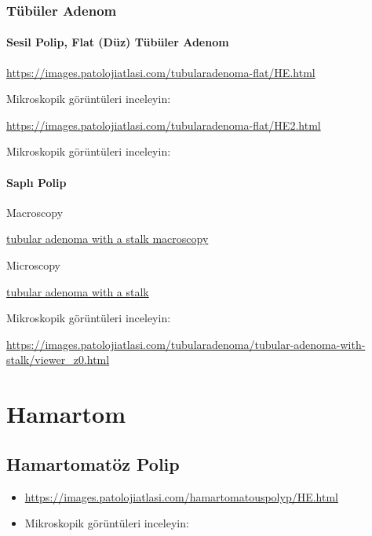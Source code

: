 \documentclass[
  letterpaper,
  DIV=11,
  numbers=noendperiod]{scrreprt}
\begin{document}
\hypertarget{tuxfcbuxfcler-adenom}{%
\subsection{Tübüler Adenom}\label{tuxfcbuxfcler-adenom}}

\hypertarget{sesil-polip-flat-duxfcz-tuxfcbuxfcler-adenom}{%
\subsubsection{Sesil Polip, Flat (Düz) Tübüler
Adenom}\label{sesil-polip-flat-duxfcz-tuxfcbuxfcler-adenom}}

\url{https://images.patolojiatlasi.com/tubularadenoma-flat/HE.html}

Mikroskopik görüntüleri inceleyin:

\url{https://images.patolojiatlasi.com/tubularadenoma-flat/HE2.html}

Mikroskopik görüntüleri inceleyin:

\hypertarget{saplux131-polip}{%
\subsubsection{Saplı Polip}\label{saplux131-polip}}

Macroscopy

\href{https://images.patolojiatlasi.com/tubularadenoma/tubular-adenoma-with-stalk-macroscopy.jpg}{tubular
adenoma with a stalk macroscopy}

Microscopy

\href{https://images.patolojiatlasi.com/tubularadenoma/tubular-adenoma-with-stalk.jpeg}{tubular
adenoma with a stalk}

Mikroskopik görüntüleri inceleyin:

\url{https://images.patolojiatlasi.com/tubularadenoma/tubular-adenoma-with-stalk/viewer_z0.html}

\hypertarget{hamartom}{%
\chapter{Hamartom}\label{hamartom}}

\hypertarget{hamartomatuxf6z-polip}{%
\section{Hamartomatöz Polip}\label{hamartomatuxf6z-polip}}

\begin{itemize}
\item
  \url{https://images.patolojiatlasi.com/hamartomatouspolyp/HE.html}
\item
  Mikroskopik görüntüleri inceleyin:
\end{itemize}
\end{document}
